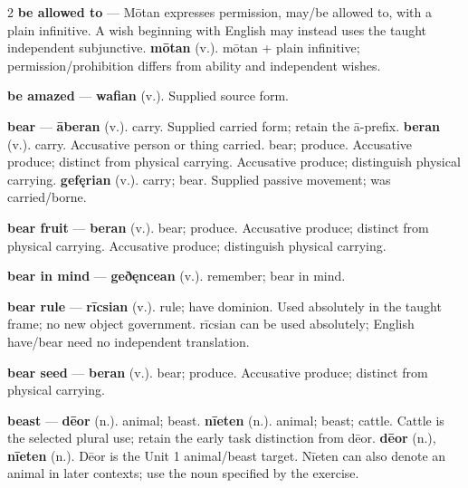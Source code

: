 \begin{multicols}{2}
\textbf{be allowed to} — Mōtan expresses permission, may/be allowed to, with a plain infinitive. A wish beginning with English may instead uses the taught independent subjunctive. \textbf{mōtan} (v.). mōtan + plain infinitive; permission/prohibition differs from ability and independent wishes.\par
\textbf{be amazed} — \textbf{wafian} (v.). Supplied source form.\par
\textbf{bear} — \textbf{āberan} (v.). carry. Supplied carried form; retain the ā-prefix. \textbf{beran} (v.). carry. Accusative person or thing carried. bear; produce. Accusative produce; distinct from physical carrying. Accusative produce; distinguish physical carrying. \textbf{gefęrian} (v.). carry; bear. Supplied passive movement; was carried/borne.\par
\textbf{bear fruit} — \textbf{beran} (v.). bear; produce. Accusative produce; distinct from physical carrying. Accusative produce; distinguish physical carrying.\par
\textbf{bear in mind} — \textbf{geðęncean} (v.). remember; bear in mind.\par
\textbf{bear rule} — \textbf{rīcsian} (v.). rule; have dominion. Used absolutely in the taught frame; no new object government. rīcsian can be used absolutely; English have/bear need no independent translation.\par
\textbf{bear seed} — \textbf{beran} (v.). bear; produce. Accusative produce; distinct from physical carrying.\par
\textbf{beast} — \textbf{dēor} (n.). animal; beast. \textbf{nīeten} (n.). animal; beast; cattle. Cattle is the selected plural use; retain the early task distinction from dēor. \textbf{dēor} (n.), \textbf{nīeten} (n.). Dēor is the Unit 1 animal/beast target. Nīeten can also denote an animal in later contexts; use the noun specified by the exercise.\par

\end{multicols}
